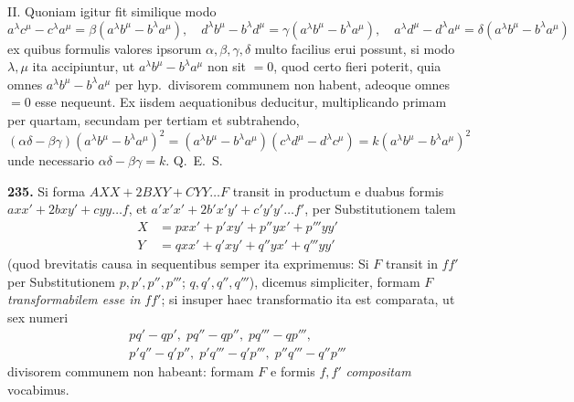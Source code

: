 \documentclass[12pt,a4paper]{article}
\theoremstyle{plain}
\theoremstyle{definition}
\theoremstyle{remark}
\theoremstyle{problemstyle}
\begin{document}
II. Quoniam igitur fit similique modo
\[
a^{\lambda}c^{\mu} - c^{\lambda}a^{\mu} = \beta(a^{\lambda}b^{\mu} - b^{\lambda}a^{\mu}), \quad
d^{\lambda}b^{\mu} - b^{\lambda}d^{\mu} = \gamma(a^{\lambda}b^{\mu} - b^{\lambda}a^{\mu}), \quad
a^{\lambda}d^{\mu} - d^{\lambda}a^{\mu} = \delta(a^{\lambda}b^{\mu} - b^{\lambda}a^{\mu})
\]
ex quibus formulis valores ipsorum $\alpha, \beta, \gamma, \delta$ multo facilius erui possunt, si modo $\lambda, \mu$ ita accipiuntur, ut $a^{\lambda}b^{\mu} - b^{\lambda}a^{\mu}$ non sit $=0$, quod certo fieri poterit, quia omnes $a^{\lambda}b^{\mu} - b^{\lambda}a^{\mu}$ per hyp.\ divisorem communem non habent, adeoque omnes $=0$ esse nequeunt. Ex iisdem aequationibus deducitur, multiplicando primam per quartam, secundam per tertiam et subtrahendo,
\[
(\alpha\delta - \beta\gamma)(a^{\lambda}b^{\mu} - b^{\lambda}a^{\mu})^2 = (a^{\lambda}b^{\mu} - b^{\lambda}a^{\mu})(c^{\lambda}d^{\mu} - d^{\lambda}c^{\mu}) = k(a^{\lambda}b^{\mu} - b^{\lambda}a^{\mu})^2
\]
unde necessario $\alpha\delta - \beta\gamma = k$. Q.\ E.\ S.


\textbf{235.}
Si forma $AXX + 2BXY + CYY \ldots F$ transit in productum e duabus formis $axx' + 2bxy' + cyy \ldots f$, et $a'x'x' + 2b'x'y' + c'y'y' \ldots f'$, per Substitutionem talem
\begin{align*}
X &= pxx' + p'xy' + p''yx' + p'''yy' \\
Y &= qxx' + q'xy' + q''yx' + q'''yy'
\end{align*}
(quod brevitatis causa in sequentibus semper ita exprimemus: Si $F$ transit in $ff'$ per Substitutionem $p, p', p'', p'''$; $q, q', q'', q'''$), dicemus simpliciter, formam $F$ \emph{transformabilem esse in $ff'$}; si insuper haec transformatio ita est comparata, ut sex numeri
\begin{gather*}
pq' - qp', \; pq'' - qp'', \; pq''' - qp''', \\
p'q'' - q'p'', \; p'q''' - q'p''', \; p''q''' - q''p'''
\end{gather*}
divisorem communem non habeant: formam $F$ e formis $f, f'$ \emph{compositam} vocabimus.
\end{document}
